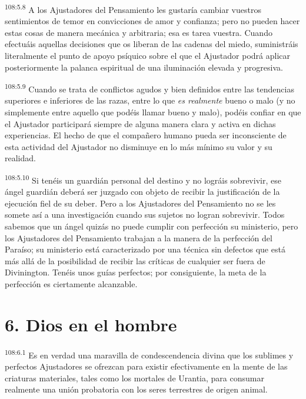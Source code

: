 \documentclass[twoside, 11pt]{book}
\begin{document}
\par
\textsuperscript{108:5.8} A los Ajustadores del Pensamiento les gustaría cambiar vuestros sentimientos de temor en convicciones de amor y confianza; pero no pueden hacer estas cosas de manera mecánica y arbitraria; esa es tarea vuestra. Cuando efectuáis aquellas decisiones que os liberan de las cadenas del miedo, suministráis literalmente el punto de apoyo psíquico sobre el que el Ajustador podrá aplicar posteriormente la palanca espiritual de una iluminación elevada y progresiva.

\par
\textsuperscript{108:5.9} Cuando se trata de conflictos agudos y bien definidos entre las tendencias superiores e inferiores de las razas, entre lo que \textit{es realmente} bueno o malo (y no simplemente entre aquello que podéis llamar bueno y malo), podéis confiar en que el Ajustador participará siempre de alguna manera clara y activa en dichas experiencias. El hecho de que el compañero humano pueda ser inconsciente de esta actividad del Ajustador no disminuye en lo más mínimo su valor y su realidad.

\par
\textsuperscript{108:5.10} Si tenéis un guardián personal del destino y no lográis sobrevivir, ese ángel guardián deberá ser juzgado con objeto de recibir la justificación de la ejecución fiel de su deber. Pero a los Ajustadores del Pensamiento no se les somete así a una investigación cuando sus sujetos no logran sobrevivir. Todos sabemos que un ángel quizás no puede cumplir con perfección su ministerio, pero los Ajustadores del Pensamiento trabajan a la manera de la perfección del Paraíso; su ministerio está caracterizado por una técnica sin defectos que está más allá de la posibilidad de recibir las críticas de cualquier ser fuera de Divinington. Tenéis unos guías perfectos; por consiguiente, la meta de la perfección es ciertamente alcanzable.

\section*{6. Dios en el hombre}
\par
\textsuperscript{108:6.1} Es en verdad una maravilla de condescendencia divina que los sublimes y perfectos Ajustadores se ofrezcan para existir efectivamente en la mente de las criaturas materiales, tales como los mortales de Urantia, para consumar realmente una unión probatoria con los seres terrestres de origen animal.
\end{document}
